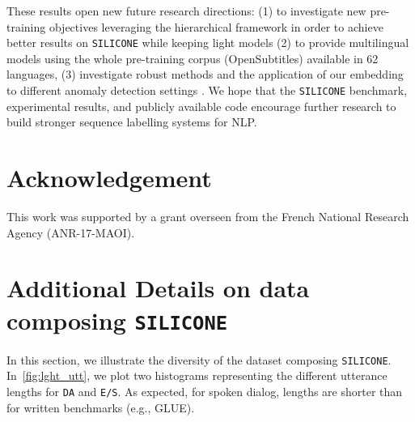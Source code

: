 \documentclass[11pt,a4paper]{article}
\begin{document}
These results open new future research directions: (1) to investigate new pre-training objectives leveraging the hierarchical framework in order to achieve better results on \texttt{SILICONE} while keeping light models (2) to provide multilingual models using the whole pre-training corpus (OpenSubtitles) available in 62 languages, (3) investigate robust methods \cite{robust_staerman} and the application of our embedding to different anomaly detection settings \cite{anomaly_1,anomaly_2}.
We hope that the \texttt{SILICONE} benchmark, experimental results, and publicly available code encourage further research to build stronger sequence labelling systems for NLP.

\section*{Acknowledgement}
This work was supported by a grant overseen from the French National Research Agency (ANR-17-MAOI).


\newpage


\appendix
\clearpage


\section{Additional Details on data composing \texttt{SILICONE}}\label{supp:copora}
In this section, we illustrate the diversity of the dataset composing \texttt{SILICONE}. In~\autoref{fig:lght_utt}, we plot two histograms representing the different utterance lengths for \texttt{DA} and \texttt{E/S}. As expected, for spoken dialog, lengths are shorter than for written benchmarks (e.g., GLUE).

\end{document}
